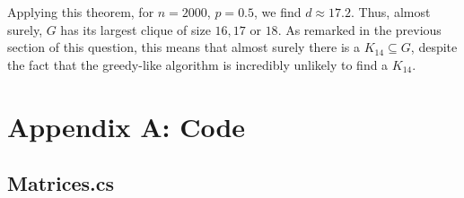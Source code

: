 \documentclass{article}
\begin{document}
Applying this theorem, for $n=2000$, $p=0.5$, we find $d \approx 17.2$. Thus, almost surely, $G$ has its largest clique of size $16, 17$ or $ 18$. As remarked in the previous section of this question, this means that almost surely there is a $K_{14} \subseteq G$, despite the fact that the greedy-like algorithm is incredibly unlikely to find a $K_{14}$.





\newpage

\newpage
				
\section{Appendix A: Code}
\label{appendix_a_code}

				
\subsection{Matrices.cs}
\end{document}

